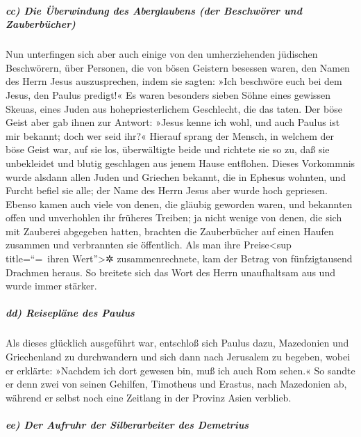 \hypertarget{cc-die-uxfcberwindung-des-aberglaubens-der-beschwuxf6rer-und-zauberbuxfccher}{%
\subparagraph{cc) Die Überwindung des Aberglaubens (der Beschwörer und
Zauberbücher)}\label{cc-die-uxfcberwindung-des-aberglaubens-der-beschwuxf6rer-und-zauberbuxfccher}}

 Nun unterfingen sich aber auch einige von den
umherziehenden jüdischen Beschwörern, über Personen, die von bösen
Geistern besessen waren, den Namen des Herrn Jesus auszusprechen, indem
sie sagten: »Ich beschwöre euch bei dem Jesus, den Paulus predigt!«
 Es waren besonders sieben Söhne eines gewissen Skeuas,
eines Juden aus hohepriesterlichem Geschlecht, die das taten.
 Der böse Geist aber gab ihnen zur Antwort: »Jesus kenne
ich wohl, und auch Paulus ist mir bekannt; doch wer seid ihr?«
 Hierauf sprang der Mensch, in welchem der böse Geist
war, auf sie los, überwältigte beide und richtete sie so zu, daß sie
unbekleidet und blutig geschlagen aus jenem Hause entflohen.
 Dieses Vorkommnis wurde alsdann allen Juden und Griechen
bekannt, die in Ephesus wohnten, und Furcht befiel sie alle; der Name
des Herrn Jesus aber wurde hoch gepriesen.  Ebenso kamen
auch viele von denen, die gläubig geworden waren, und bekannten offen
und unverhohlen ihr früheres Treiben;  ja nicht wenige
von denen, die sich mit Zauberei abgegeben hatten, brachten die
Zauberbücher auf einen Haufen zusammen und verbrannten sie öffentlich.
Als man ihre Preise\textless sup title=``=~ihren Wert''\textgreater✲
zusammenrechnete, kam der Betrag von fünfzigtausend Drachmen heraus.
 So breitete sich das Wort des Herrn unaufhaltsam aus und
wurde immer stärker.

\hypertarget{dd-reisepluxe4ne-des-paulus}{%
\subparagraph{dd) Reisepläne des
Paulus}\label{dd-reisepluxe4ne-des-paulus}}

 Als dieses glücklich ausgeführt war, entschloß sich
Paulus dazu, Mazedonien und Griechenland zu durchwandern und sich dann
nach Jerusalem zu begeben, wobei er erklärte: »Nachdem ich dort gewesen
bin, muß ich auch Rom sehen.«  So sandte er denn zwei von
seinen Gehilfen, Timotheus und Erastus, nach Mazedonien ab, während er
selbst noch eine Zeitlang in der Provinz Asien verblieb.

\hypertarget{ee-der-aufruhr-der-silberarbeiter-des-demetrius}{%
\subparagraph{ee) Der Aufruhr der Silberarbeiter des
Demetrius}\label{ee-der-aufruhr-der-silberarbeiter-des-demetrius}}

